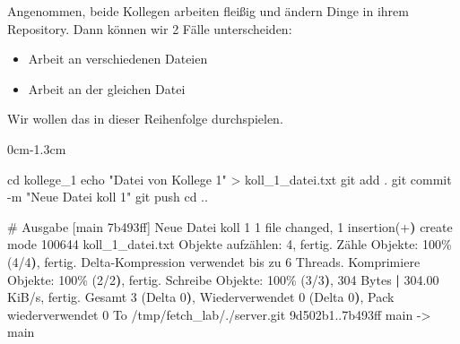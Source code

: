 \documentclass[
  ngerman,
  letterpaper,
  DIV=11]{scrreprt}
\newenvironment{Shaded}{\begin{snugshade}}{\end{snugshade}}
\newcommand{\AttributeTok}[1]{\textcolor[rgb]{0.40,0.45,0.13}{#1}}
\newcommand{\BuiltInTok}[1]{\textcolor[rgb]{0.00,0.23,0.31}{#1}}
\newcommand{\CommentTok}[1]{\textcolor[rgb]{0.37,0.37,0.37}{#1}}
\newcommand{\ErrorTok}[1]{\textcolor[rgb]{0.68,0.00,0.00}{#1}}
\newcommand{\ExtensionTok}[1]{\textcolor[rgb]{0.00,0.23,0.31}{#1}}
\newcommand{\FunctionTok}[1]{\textcolor[rgb]{0.28,0.35,0.67}{#1}}
\newcommand{\KeywordTok}[1]{\textcolor[rgb]{0.00,0.23,0.31}{\textbf{#1}}}
\newcommand{\NormalTok}[1]{\textcolor[rgb]{0.00,0.23,0.31}{#1}}
\newcommand{\OperatorTok}[1]{\textcolor[rgb]{0.37,0.37,0.37}{#1}}
\newcommand{\StringTok}[1]{\textcolor[rgb]{0.13,0.47,0.30}{#1}}
\providecommand{\tightlist}{%
  \setlength{\itemsep}{0pt}\setlength{\parskip}{0pt}}
\newcommand{\blarge}{\begin{adjustwidth}{0cm}{-1.3cm}}
\newcommand{\elarge}{\end{adjustwidth}}
\begin{document}
Angenommen, beide Kollegen arbeiten fleißig und ändern Dinge in ihrem
Repository. Dann können wir 2 Fälle unterscheiden:

\begin{itemize}
\tightlist
\item
  Arbeit an verschiedenen Dateien
\item
  Arbeit an der gleichen Datei
\end{itemize}

Wir wollen das in dieser Reihenfolge durchspielen.

\blarge

\begin{Shaded}
\begin{Highlighting}[]
\BuiltInTok{cd}\NormalTok{ kollege\_1 }
\BuiltInTok{echo} \StringTok{"Datei von Kollege 1"} \OperatorTok{\textgreater{}}\NormalTok{ koll\_1\_datei.txt }
\FunctionTok{git}\NormalTok{ add .}
\FunctionTok{git}\NormalTok{ commit }\AttributeTok{{-}m} \StringTok{"Neue Datei koll 1"}
\FunctionTok{git}\NormalTok{ push}
\BuiltInTok{cd}\NormalTok{ ..}

\CommentTok{\# Ausgabe }
\ExtensionTok{[main}\NormalTok{ 7b493ff] Neue Datei koll 1}
 \ExtensionTok{1}\NormalTok{ file changed, 1 insertion}\ErrorTok{(}\ExtensionTok{+}\KeywordTok{)}
 \ExtensionTok{create}\NormalTok{ mode 100644 koll\_1\_datei.txt}
\ExtensionTok{Objekte}\NormalTok{ aufzählen: 4, fertig.}
\ExtensionTok{Zähle}\NormalTok{ Objekte: 100\% }\ErrorTok{(}\ExtensionTok{4/4}\KeywordTok{)}\ExtensionTok{,}\NormalTok{ fertig.}
\ExtensionTok{Delta{-}Kompression}\NormalTok{ verwendet bis zu 6 Threads.}
\ExtensionTok{Komprimiere}\NormalTok{ Objekte: 100\% }\ErrorTok{(}\ExtensionTok{2/2}\KeywordTok{)}\ExtensionTok{,}\NormalTok{ fertig.}
\ExtensionTok{Schreibe}\NormalTok{ Objekte: 100\% }\ErrorTok{(}\ExtensionTok{3/3}\KeywordTok{)}\ExtensionTok{,}\NormalTok{ 304 Bytes }\KeywordTok{|} \ExtensionTok{304.00}\NormalTok{ KiB/s, fertig.}
\ExtensionTok{Gesamt}\NormalTok{ 3 }\ErrorTok{(}\ExtensionTok{Delta}\NormalTok{ 0}\KeywordTok{)}\ExtensionTok{,}\NormalTok{ Wiederverwendet 0 }\ErrorTok{(}\ExtensionTok{Delta}\NormalTok{ 0}\KeywordTok{)}\ExtensionTok{,}\NormalTok{ Pack wiederverwendet 0}
\ExtensionTok{To}\NormalTok{ /tmp/fetch\_lab/./server.git}
   \ExtensionTok{9d502b1..7b493ff}\NormalTok{  main }\AttributeTok{{-}}\OperatorTok{\textgreater{}}\NormalTok{ main}
\end{Highlighting}
\end{Shaded}

\elarge
\end{document}
